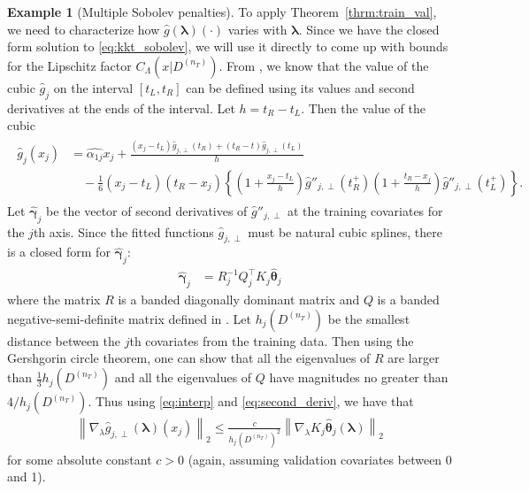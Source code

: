 \documentclass[10pt]{book}
\theoremstyle{definition}
\newtheorem{example}{Example}
\begin{document}
\begin{example}[Multiple Sobolev penalties]
	To apply Theorem~\ref{thrm:train_val}, we need to characterize how $\hat{g}(\boldsymbol{\lambda})(\cdot)$ varies with $\boldsymbol{\lambda}$.
	Since we have the closed form solution to \eqref{eq:kkt_sobolev}, we will use it directly to come up with bounds for the Lipschitz factor $C_\Lambda(x | D^{(n_T)})$.
	From \citet{green1993nonparametric}, we know that the value of the cubic $\hat{g}_j$ on the interval $[t_L, t_R]$ can be defined using its values and second derivatives at the ends of the interval.
	Let $h = t_R - t_L$.
	Then the value of the cubic
	\begin{align}
	\begin{split}
	\hat{g}_j(x_j)
	& = \hat{\alpha_{1j}} x_j
	+ \frac{(x_j - t_L) \hat{g}_{j, \perp} (t_R) + (t_R - t) \hat{g}_{j, \perp}(t_L)}{h}\\
	& \quad - \frac{1}{6}(x_j - t_L)(t_R - x_j) \left\{
	\left(
	1 + \frac{x_j - t_L}{h}
	\right) \hat{g}''_{j, \perp}(t_R^+)
	\left(
	1 + \frac{t_R - x_j}{h}
	\right) \hat{g}''_{j, \perp}(t_L^+)
	\right \}.
	\label{eq:interp}
	\end{split}
	\end{align}
	Let $\hat{\boldsymbol{\gamma}}_j$ be the vector of second derivatives of $\hat{g}''_{j, \perp}$ at the training covariates for the $j$th axis.
	Since the fitted functions $\hat{g}_{j, \perp}$ must be natural cubic splines, there is a closed form for $\hat{\boldsymbol{\gamma}}_j$:
	\begin{align}
	\hat{\boldsymbol{\gamma}}_j & = R^{-1}_j Q^\top_j K_j \hat{\boldsymbol{\theta}}_j
	\label{eq:second_deriv}
	\end{align}
	where the matrix $R$ is a banded diagonally dominant matrix and $Q$ is a banded negative-semi-definite matrix defined in \citet{green1993nonparametric}.
	Let $h_j(D^{(n_T)})$ be the smallest distance between the $j$th covariates from the training data.
	Then using the Gershgorin circle theorem, one can show that all the eigenvalues of $R$ are larger than $\frac{1}{3} h_j(D^{(n_T)})$ and all the eigenvalues of $Q$ have magnitudes no greater than $4/h_j(D^{(n_T)})$.
	Thus using \eqref{eq:interp} and \eqref{eq:second_deriv}, we have that
	\begin{align}
	\left \|
	\nabla_{\lambda} \hat{g}_{j, \perp}(\boldsymbol{\lambda})(x_j)
	\right \|_2
	\le
	\frac{c}{h_j(D^{(n_T)})^2}
	\left\|
	\nabla_{\lambda} K_j \hat{\boldsymbol{\theta}}_j(\boldsymbol{\lambda})
	\right \|_2
	\end{align}
	for some absolute constant $c > 0$ (again, assuming validation covariates between 0 and 1).
	

\end{example}
\end{document}
